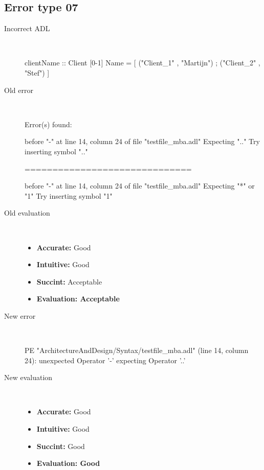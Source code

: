 \subsection{Error type 07}
  \begin{description}
  \item[Incorrect ADL]~\\
\begin{adl}
clientName :: Client [0-1] Name =
    [ ("Client_1"      , "Martijn")
    ; ("Client_2"      , "Stef")
    ]\end{adl}
  \item[Old error]~\\
\begin{haskell}
Error(s) found:

before "-" at line 14, column 24 of file "testfile_mba.adl"
Expecting ".."
Try inserting symbol ".."

==============================

before "-" at line 14, column 24 of file "testfile_mba.adl"
Expecting "*" or "1"
Try inserting symbol "1"\end{haskell}
  \item[Old evaluation]~\\
    \begin{itemize}
    \item \textbf{Accurate:} Good
    \item \textbf{Intuitive:} Good
    \item \textbf{Succint:} Acceptable
    \item \textbf{Evaluation: Acceptable}
    \end{itemize}
  \item[New error]~\\
\begin{haskell}
PE "ArchitectureAndDesign/Syntax/testfile_mba.adl" (line 14, column 24):
unexpected Operator '-'
expecting Operator '..'\end{haskell}
  \item[New evaluation]~\\
    \begin{itemize}
    \item \textbf{Accurate:} Good
    \item \textbf{Intuitive:} Good
    \item \textbf{Succint:} Good
    \item \textbf{Evaluation: Good
}
    \end{itemize}
  \end{description}

